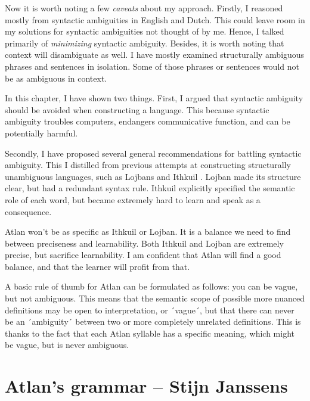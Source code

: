 Now it is worth noting a few {\it caveats} about my approach. Firstly, I reasoned mostly from syntactic ambiguities in English and Dutch. This could leave room in my solutions for syntactic ambiguities not thought of by me. Hence, I talked primarily of {\it minimizing} syntactic ambiguity. Besides, it is worth noting that context will disambiguate as well. I have mostly examined structurally ambiguous phrases and sentences in isolation. Some of those phrases or sentences would not be as ambiguous in context.  


In this chapter, I have shown two things. First, I argued that syntactic ambiguity should be avoided when constructing a language. This because syntactic ambiguity troubles computers, endangers communicative function, and  can be potentially harmful. 

Secondly, I have proposed several general recommendations for battling syntactic ambiguity. This I distilled from previous attempts at constructing structurally unambiguous languages, such as Lojbans and Ithkuil . Lojban made its structure clear, but had a redundant syntax rule. Ithkuil explicitly specified the semantic role of each word, but became extremely hard to learn and speak as a consequence. 

Atlan won't be as specific as Ithkuil or Lojban. It is a balance we need to find between preciseness and learnability. Both Ithkuil and Lojban are extremely precise, but sacrifice learnability. I am confident that Atlan will find a good balance, and that the learner will profit from that. 

A basic rule of thumb for Atlan can be formulated as follows: you can be vague, but not ambiguous. This means that the semantic scope of possible more nuanced definitions may be open to interpretation, or ´vague´, but that there can never be an ´ambiguity´ between two or more completely unrelated definitions. This is thanks to the fact that each Atlan syllable has a specific meaning, which might be vague, but is never ambiguous.

\section{Atlan's grammar -- {\small Stijn Janssens}}


